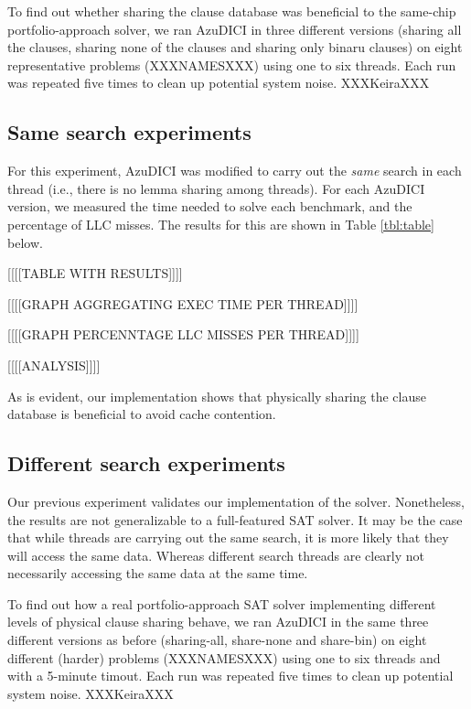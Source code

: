 
To find out whether sharing the clause database was beneficial to the
same-chip portfolio-approach solver, we ran AzuDICI in three different
versions (sharing all the clauses, sharing none of the clauses and
sharing only binaru clauses) on eight representative problems
(XXXNAMESXXX) using one to six threads. Each run was repeated five
times to clean up potential system noise. XXXKeiraXXX

\subsection{Same search experiments}
\label{sec:samesearch}

For this experiment, AzuDICI was modified to carry out the {\em same}
search in each thread (i.e., there is no lemma sharing among
threads). For each AzuDICI version, we measured the time needed to
solve each benchmark, and the percentage of LLC misses. The results
for this are shown in Table \ref{tbl:table} below.

[[[[TABLE WITH RESULTS]]]]

[[[[GRAPH AGGREGATING EXEC TIME PER THREAD]]]]

[[[[GRAPH PERCENNTAGE LLC MISSES PER THREAD]]]]

[[[[ANALYSIS]]]]

As is evident, our implementation shows that physically sharing the
clause database is beneficial to avoid cache contention.

\subsection{Different search experiments}
\label{sec:diffsearch}

Our previous experiment validates our implementation of the
solver. Nonetheless, the results are not generalizable to a
full-featured SAT solver. It may be the case that while threads are
carrying out the same search, it is more likely that they will access
the same data. Whereas different search threads are clearly not
necessarily accessing the same data at the same time.

To find out how a real portfolio-approach SAT solver implementing
different levels of physical clause sharing behave, we ran AzuDICI in
the same three different versions as before (sharing-all, share-none
and share-bin) on eight different (harder) problems (XXXNAMESXXX)
using one to six threads and with a 5-minute timout. Each run was
repeated five times to clean up potential system noise. XXXKeiraXXX

